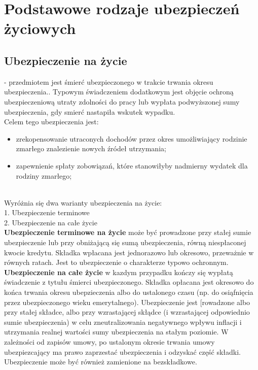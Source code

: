 \documentclass{article}
\begin{document}
\newpage

\section{Podstawowe rodzaje ubezpieczeń życiowych}

\subsection{Ubezpieczenie na życie} - przedmiotem jest śmierć ubezpieczonego w trakcie trwania okresu ubezpieczenia.. Typowym świadczeniem dodatkowym jest objęcie ochroną ubezpieczeniową utraty zdolności do pracy lub wypłata podwyższonej sumy ubezpieczenia, gdy smierć nastapiła wskutek wypadku.\\

Celem tego ubezpieczenia jest:

\begin{itemize}
	\item zrekopensowanie utraconych dochodów przez okres umożliwiający rodzinie zmarłego znalezienie nowych źródeł utrzymania;
	\item zapewnienie spłaty zobowiązań, które stanowiłyby nadmierny wydatek dla rodziny zmarłego;
\end{itemize}\\

Wyróżnia się dwa warianty ubezpieczenia na życie:\\

1. Ubezpieczenie terminowe\\

2. Ubezpieczenie na całe życie\\

\textbf{Ubezpieczenie terminowe na życie} może być prowadzone przy stałej sumie ubezpieczenie lub przy obniżającą się sumą ubezpieczenia, równą niespłaconej kwocie kredytu. Składka wpłacana jest jednorazowo lub okresowo, przeważnie w równych ratach. Jest to ubezpieczenie o charakterze typowo ochronnym.\\

\textbf{Ubezpieczenie na całe życie} w kazdym przypadku kończy się wypłatą świadczenie z tytułu śmierci ubezpieczonego. Składka opłacana jest okresowo do końca trwania okresu ubepzieczenia albo do ustalonego czasu (np. do osiąfnięcia przez ubezpieczonego wieku emerytalnego). Ubezpieczenie jest [rowadzone albo przy stałej składce, albo przy wzrastającej skłądce (i wzrastającej odpowiednio sumie ubezpieczenia) w celu zneutralizowania negatywnego wpływu inflacji i utrzymania realnej wartości sumy ubezpieczenia na stałym poziomie. W zależności od zapisów umowy, po ustalonym okresie trwania umowy ubezpiezcający ma prawo zaprzestać ubezpieczenia i odzyskać część składki. Ubezpieczenie może być również zamienione na bezskładkowe.
\end{document}
